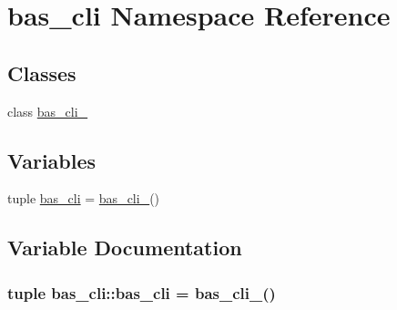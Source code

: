 \hypertarget{namespacebas__cli}{\section{bas\-\_\-cli \-Namespace \-Reference}
\label{namespacebas__cli}
}
\subsection*{\-Classes}
\begin{DoxyCompactItemize}
\item 
class \hyperlink{classbas__cli_1_1bas__cli__}{bas\-\_\-cli\-\_\-}
\end{DoxyCompactItemize}
\subsection*{\-Variables}
\begin{DoxyCompactItemize}
\item 
tuple \hyperlink{namespacebas__cli_a364b6df653bb5375b50e6dd0a9c8fe82}{bas\-\_\-cli} = \hyperlink{classbas__cli_1_1bas__cli__}{bas\-\_\-cli\-\_\-}()
\end{DoxyCompactItemize}


\subsection{\-Variable \-Documentation}
\hypertarget{namespacebas__cli_a364b6df653bb5375b50e6dd0a9c8fe82}{
\subsubsection[{bas\-\_\-cli}]{\setlength{\rightskip}{0pt plus 5cm}tuple {\bf bas\-\_\-cli\-::bas\-\_\-cli} = {\bf bas\-\_\-cli\-\_\-}()}}\label{namespacebas__cli_a364b6df653bb5375b50e6dd0a9c8fe82}
